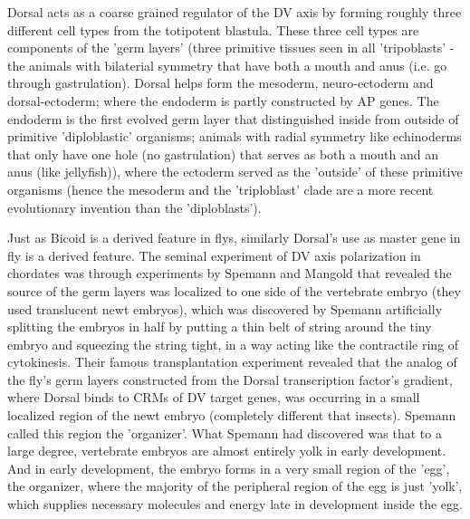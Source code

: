   Dorsal acts as a coarse grained regulator of the DV axis by forming roughly three different cell types from the totipotent blastula.  These three cell types are components of the 'germ layers' (three primitive tissues seen in all 'tripoblasts' - the animals with bilaterial symmetry that have both a mouth and anus (i.e. go through gastrulation).  Dorsal helps form the mesoderm, neuro-ectoderm and dorsal-ectoderm; where the endoderm is partly constructed by AP genes.  The endoderm is the first evolved germ layer that distinguished inside from outside of primitive 'diploblastic' organisms; animals with radial symmetry like echinoderms that only have one hole (no gastrulation) that serves as both a mouth and an anus (like jellyfish)), where the ectoderm served as the 'outside' of these primitive organisms (hence the mesoderm and the 'triploblast' clade are a more recent evolutionary invention than the 'diploblasts'). 


Just as Bicoid is a derived feature in flys, similarly Dorsal's use as master gene in fly is a derived feature.  The seminal experiment of DV axis polarization in chordates was through experiments by Spemann and Mangold that revealed the source of the germ layers was localized to one side of the vertebrate embryo (they used translucent newt embryos), which was discovered by Spemann artificially splitting the embryos in half by putting a thin belt of string around the tiny embryo and squeezing the string tight, in a way acting like the contractile ring of cytokinesis\cite{devogilbert}.  Their famous transplantation experiment revealed that the analog of the fly's germ layers constructed from the Dorsal transcription factor's gradient, where Dorsal binds to CRMs of DV target genes, was occurring in a small localized region of the newt embryo (completely different that insects).  Spemann called this region the 'organizer'.  What Spemann had discovered was that to a large degree, vertebrate embryos are almost entirely yolk in early development.  And in early development, the embryo forms in a very small region of the 'egg', the organizer, where the majority of the peripheral region of the egg is just 'yolk', which supplies necessary molecules and energy late in development inside the egg.   

